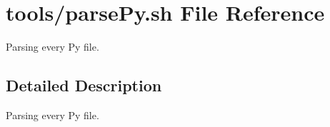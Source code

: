 \hypertarget{parsePy_8sh}{}\section{tools/parse\+Py.sh File Reference}
\label{parsePy_8sh}


Parsing every Py file.  




\subsection{Detailed Description}
Parsing every Py file. 

